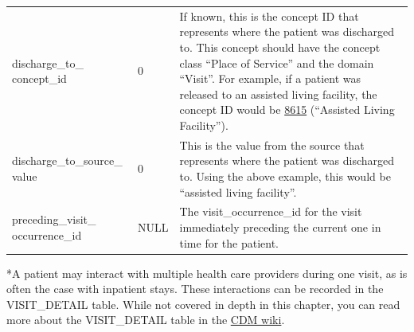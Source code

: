 \documentclass[11pt]{book}
\begin{document}
\begin{longtable}[]{@{}lll@{}}
\begin{minipage}[t]{0.28\columnwidth}
discharge\_to\_ concept\_id\strut
\end{minipage} & \begin{minipage}[t]{0.16\columnwidth}\raggedright\strut
0\strut
\end{minipage} & \begin{minipage}[t]{0.48\columnwidth}\raggedright\strut
If known, this is the concept ID that represents where the patient was
discharged to. This concept should have the concept class ``Place of
Service'' and the domain ``Visit''. For example, if a patient was
released to an assisted living facility, the concept ID would be
\href{http://athena.ohdsi.org/search-terms/terms/8615}{8615} (``Assisted
Living Facility'').\strut
\end{minipage}\tabularnewline
\begin{minipage}[t]{0.28\columnwidth}\raggedright\strut
discharge\_to\_source\_ value\strut
\end{minipage} & \begin{minipage}[t]{0.16\columnwidth}\raggedright\strut
0\strut
\end{minipage} & \begin{minipage}[t]{0.48\columnwidth}\raggedright\strut
This is the value from the source that represents where the patient was
discharged to. Using the above example, this would be ``assisted living
facility''.\strut
\end{minipage}\tabularnewline
\begin{minipage}[t]{0.28\columnwidth}\raggedright\strut
preceding\_visit\_ occurrence\_id\strut
\end{minipage} & \begin{minipage}[t]{0.16\columnwidth}\raggedright\strut
NULL\strut
\end{minipage} & \begin{minipage}[t]{0.48\columnwidth}\raggedright\strut
The visit\_occurrence\_id for the visit immediately preceding the
current one in time for the patient.\strut
\end{minipage}\tabularnewline
\bottomrule
\end{longtable}

*A patient may interact with multiple health care providers during one
visit, as is often the case with inpatient stays. These interactions can
be recorded in the VISIT\_DETAIL table. While not covered in depth in
this chapter, you can read more about the VISIT\_DETAIL table in the
\href{https://github.com/OHDSI/CommonDataModel/wiki/VISIT_DETAIL}{CDM
wiki}.
\end{document}

